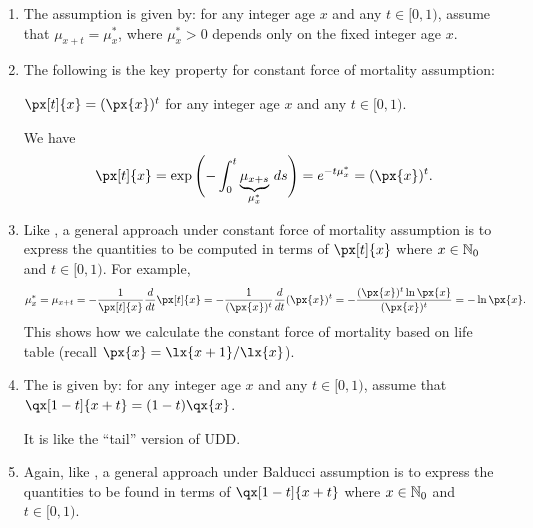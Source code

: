 \begin{enumerate}
\item The  assumption is given by: for any
integer age \(x\) and any \(t\in[0,1)\), assume that \(\mu_{x+t}=\mu_x^*\),
where \(\mu_x^*>0\) depends only on the fixed integer age \(x\).
\item The following is the key property for constant force of mortality
assumption:
\begin{proposition}
\(\px[t]{x}=(\px{x})^t\) for any integer age \(x\) and any \(t\in[0,1)\).
\end{proposition}
\begin{pf}
We have
\[
\px[t]{x}=\exp\qty\Bigg(-\int_{0}^{t}\underbrace{\mu_{x+s}}_{\mu_x^*}\,ds)
=e^{-t\mu_x^*}
=(\px{x})^t.
\]
\end{pf}
\item Like , a general approach under constant force
of mortality assumption is to express the quantities to be computed in terms of
\(\px[t]{x}\) where \(x\in\mathbb{N}_0\) and \(t\in[0,1)\). For example,
\[\mu_x^*=\mu_{x+t}
=-\frac{1}{\px[t]{x}}\frac{d}{dt}\px[t]{x}
=-\frac{1}{(\px{x})^t}\frac{d}{dt}(\px{x})^t
=-\frac{(\px{x})^t\ln\px{x}}{(\px{x})^t}
=-\ln\px{x}.
\]
This shows how we calculate the constant force of mortality based on life table
(recall \(\px{x}=\lx{x+1}/\lx{x}\)).
\item The  is given by: for any integer age \(x\) and
any \(t\in [0,1)\), assume that \(\qx[1-t]{x+t}=(1-t)\qx{x}\). \begin{note}
It is like the ``tail'' version of UDD.
\end{note}
\item Again, like , a general approach under
Balducci assumption is to express the quantities to be found in terms of
\(\qx[1-t]{x+t}\) where \(x\in\mathbb{N}_0\) and \(t\in[0,1)\).
\end{enumerate}

